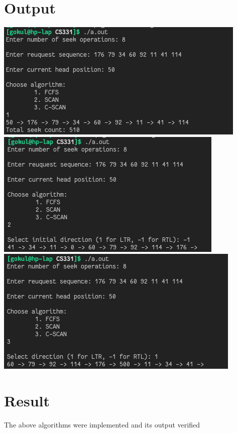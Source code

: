 \documentclass[13pt,oneside]{book}
\begin{document}
    \section*{Output}
    \includegraphics[]{img/p2/ss1.png} \\
    \includegraphics[]{img/p2/ss2.png} \\
    \includegraphics[]{img/p2/ss3.png} 
    
\Large
\section*{Result}
\large
The above algorithms were implemented and its output verified
\end{document}
